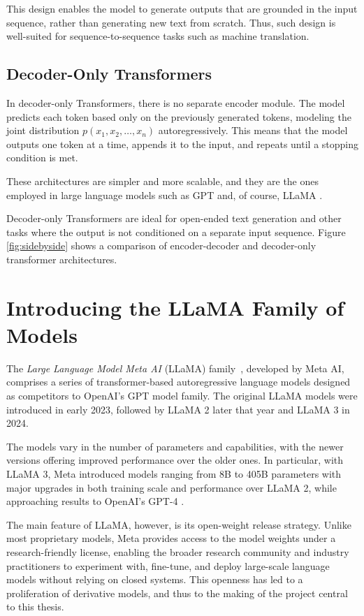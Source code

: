 This design enables the model to generate outputs that are grounded in the input sequence, rather than generating new text from scratch. Thus, such design is well-suited for sequence-to-sequence tasks such as machine translation.

\subsection{Decoder-Only Transformers}

In decoder-only Transformers, there is no separate encoder module. The model predicts each token based only on the previously generated tokens, modeling the joint distribution \( p(x_1, x_2, \ldots, x_n) \) autoregressively. This means that the model outputs one token at a time, appends it to the input, and repeats until a stopping condition is met.

These architectures are simpler and more scalable, and they are the ones employed in large language models such as GPT \cite{gpt} and, of course, LLaMA \cite{llama}.

Decoder-only Transformers are ideal for open-ended text generation and other tasks where the output is not conditioned on a separate input sequence.
Figure \ref{fig:sidebyside} shows a comparison of encoder-decoder and decoder-only transformer architectures.

\section{Introducing the LLaMA Family of Models} \label{llama_overview}

The \textit{Large Language Model Meta AI} (LLaMA) family~\cite{llama}, developed by Meta AI, comprises a series of transformer-based autoregressive language models designed as competitors to OpenAI's GPT model family. The original LLaMA models were introduced in early 2023, followed by LLaMA 2 \cite{llama2} later that year and LLaMA 3 \cite{llama3} in 2024.

The models vary in the number of parameters and capabilities, with the newer versions offering improved performance over the older ones. In particular, with LLaMA 3, Meta introduced models ranging from 8B to 405B parameters with major upgrades in both training scale and performance over LLaMA 2, while approaching results to OpenAI's GPT-4 \cite{gpt4} \cite{llama3}.

The main feature of LLaMA, however, is its open-weight release strategy. Unlike most proprietary models, Meta provides access to the model weights under a research-friendly license, enabling the broader research community and industry practitioners to experiment with, fine-tune, and deploy large-scale language models without relying on closed systems. This openness has led to a proliferation of derivative models, and thus to the making of the project central to this thesis.


